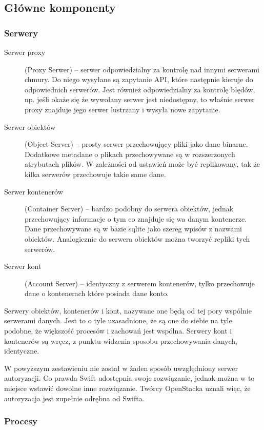 \subsection{Główne komponenty}\label{sub:glowne komponenty}

\subsubsection{Serwery}\label{sub:serwery}

\begin{description}
\item[Serwer proxy] (Proxy Serwer) -- serwer odpowiedzialny za kontrolę nad innymi serwerami chmury. Do niego wysyłane są zapytanie API, które następnie kieruje do odpowiednich serwerów. Jest również odpowiedzialny za kontrolę błędów, np. jeśli okaże się że wywołany serwer jest niedostępny, to właśnie serwer proxy znajduje jego serwer lustrzany i wysyła nowe zapytanie.
\item[Serwer obiektów] (Object Server) -- prosty serwer przechowujący pliki jako dane binarne. Dodatkowe metadane o plikach przechowywane są w rozszerzonych atrybutach plików. W zależności od ustawień może być replikowany, tak że kilka serwerów przechowuje takie same dane.
\item[Serwer kontenerów] (Container Server) -- bardzo podobny do serwera obiektów, jednak przechowujący informacje o tym co znajduje się wa danym kontenerze. Dane przechowywane są w bazie sqlite jako szereg wpisów z nazwami obiektów. Analogicznie do serwera obiektów można tworzyć repliki tych serwerów.
\item[Serwer kont] (Account Server) -- identyczny z serwerem kontenerów, tylko przechowuje dane o kontenerach które posiada dane konto.
\end{description}

Serwery obiektów, kontenerów i kont, nazywane one będą od tej pory wspólnie serwerami danych. Jest to o tyle uzasadnione, że są one do siebie na tyle podobne, że większość procesów i zachowań jest wspólna. Serwery kont i kontenerów są wręcz, z punktu widzenia sposobu przechowywania danych, identyczne.

W powyższym zestawieniu nie został w żaden sposób uwzględniony serwer autoryzacji. Co prawda Swift udostępnia swoje rozwiązanie, jednak można w to miejsce wstawić dowolne inne rozwiązanie. Twórcy OpenStacka uznali więc, że autoryzacja jest zupełnie odrębna od Swifta.

\subsubsection{Procesy}\label{sub:procesy}


